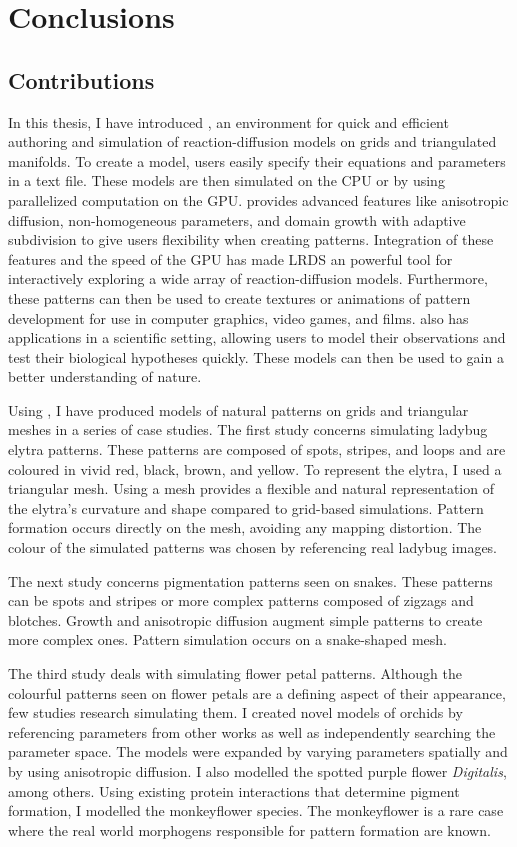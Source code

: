 \chapter{Conclusions}
\section{Contributions}
In this thesis, I have introduced \ProgramName{}, an environment for quick and efficient authoring and simulation of reaction-diffusion models on grids and triangulated manifolds. To create a model, users easily specify their equations and parameters in a text file. These models are then simulated on the CPU or by using parallelized computation on the GPU. \ProgramName{} provides advanced features like anisotropic diffusion, non-homogeneous parameters, and domain growth with adaptive subdivision to give users flexibility when creating patterns. Integration of these features and the speed of the GPU has made LRDS an powerful tool for interactively exploring a wide array of reaction-diffusion models. Furthermore, these patterns can then be used to create textures or animations of pattern development for use in computer graphics, video games, and films. \ProgramName{} also has applications in a scientific setting, allowing users to model their observations and test their biological hypotheses quickly. These models can then be used to gain a better understanding of nature.

Using \ProgramName{}, I have produced models of natural patterns on grids and triangular meshes in a series of case studies. The first study concerns simulating ladybug elytra patterns. These patterns are composed of spots, stripes, and loops and are coloured in vivid red, black, brown, and yellow. To represent the elytra, I used a triangular mesh. Using a mesh provides a flexible and natural representation of the elytra's curvature and shape compared to grid-based simulations. Pattern formation occurs directly on the mesh, avoiding any mapping distortion. The colour of the simulated patterns was chosen by referencing real ladybug images.

The next study concerns pigmentation patterns seen on snakes. These patterns can be spots and stripes or more complex patterns composed of zigzags and blotches. Growth and anisotropic diffusion augment simple patterns to create more complex ones. Pattern simulation occurs on a snake-shaped mesh.

The third study deals with simulating flower petal patterns. Although the colourful patterns seen on flower petals are a defining aspect of their appearance, few studies research simulating them. I created novel models of orchids by referencing parameters from other works as well as independently searching the parameter space. The models were expanded by varying parameters spatially and by using anisotropic diffusion. I also modelled the spotted purple flower \textit{Digitalis}, among others. Using existing protein interactions that determine pigment formation, I modelled the monkeyflower species. The monkeyflower is a rare case where the real world morphogens responsible for pattern formation are known.

